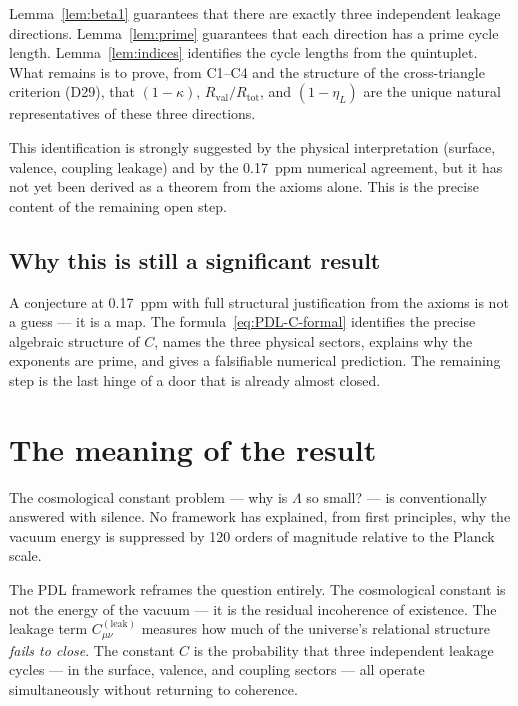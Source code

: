 \documentclass[12pt,a4paper]{article}
\newcommand{\Rtot}{R_{\mathrm{tot}}}
\newcommand{\Rval}{R_{\mathrm{val}}}
\newcommand{\kap}{\kappa}
\newcommand{\etaL}{\eta_L}
\newcommand{\Lam}{\Lambda}
\begin{document}
Lemma~\ref{lem:beta1} guarantees that there are exactly three independent leakage directions. Lemma~\ref{lem:prime} guarantees that each direction has a prime cycle length. Lemma~\ref{lem:indices} identifies the cycle lengths from the quintuplet. What remains is to prove, from C1--C4 and the structure of the cross-triangle criterion (D29), that $(1-\kap)$, $\Rval/\Rtot$, and $(1-\etaL)$ are the unique natural representatives of these three directions.

This identification is strongly suggested by the physical interpretation (surface, valence, coupling leakage) and by the 0.17~ppm numerical agreement, but it has not yet been derived as a theorem from the axioms alone. This is the precise content of the remaining open step.

\subsection{Why this is still a significant result}

A conjecture at 0.17~ppm with full structural justification from the axioms is not a guess — it is a map. The formula~\eqref{eq:PDL-C-formal} identifies the precise algebraic structure of $C$, names the three physical sectors, explains why the exponents are prime, and gives a falsifiable numerical prediction. The remaining step is the last hinge of a door that is already almost closed.

\section{The meaning of the result}
\label{sec:meaning}

The cosmological constant problem — why is $\Lam$ so small? — is conventionally answered with silence. No framework has explained, from first principles, why the vacuum energy is suppressed by 120 orders of magnitude relative to the Planck scale.

The PDL framework reframes the question entirely. The cosmological constant is not the energy of the vacuum — it is the residual incoherence of existence. The leakage term $C^{(\mathrm{leak})}_{\mu\nu}$ measures how much of the universe's relational structure \emph{fails to close}. The constant $C$ is the probability that three independent leakage cycles — in the surface, valence, and coupling sectors — all operate simultaneously without returning to coherence.
\end{document}
